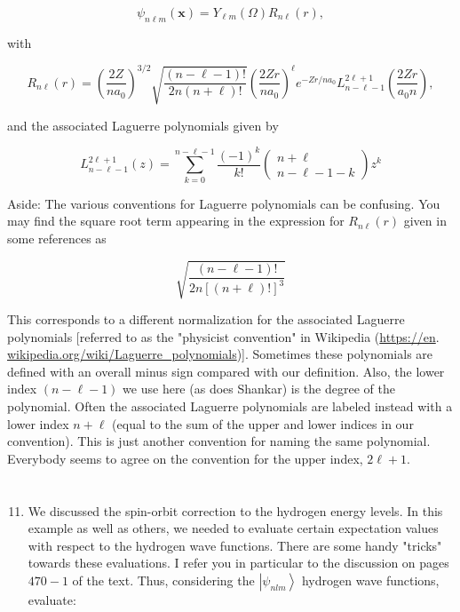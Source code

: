 \documentclass[12pt]{article}
\begin{document}
$$
\psi_{n \ell m}(\mathbf{x})=Y_{\ell m}(\Omega) R_{n \ell}(r),
$$

with

$$
R_{n \ell}(r)=\left(\frac{2 Z}{n a_{0}}\right)^{3 / 2} \sqrt{\frac{(n-\ell-1) !}{2 n(n+\ell) !}}\left(\frac{2 Z r}{n a_{0}}\right)^{\ell} e^{-Z r / n a_{0}} L_{n-\ell-1}^{2 \ell+1}\left(\frac{2 Z r}{a_{0} n}\right),
$$

and the associated Laguerre polynomials given by

$$
L_{n-\ell-1}^{2 \ell+1}(z)=\sum_{k=0}^{n-\ell-1} \frac{(-1)^{k}}{k !}\left(\begin{array}{c}
n+\ell \\
n-\ell-1-k
\end{array}\right) z^{k}
$$

Aside: The various conventions for Laguerre polynomials can be confusing. You may find the square root term appearing in the expression for $R_{n \ell}(r)$ given in some references as

$$
\sqrt{\frac{(n-\ell-1) !}{2 n[(n+\ell) !]^{3}}}
$$

This corresponds to a different normalization for the associated Laguerre polynomials [referred to as the "physicist convention" in Wikipedia (\href{https://en}{https://en}. \href{http://wikipedia.org/wiki/Laguerre_polynomials}{wikipedia.org/wiki/Laguerre\_polynomials})]. Sometimes these polynomials are defined with an overall minus sign compared with our definition. Also, the lower index $(n-\ell-1)$ we use here (as does Shankar) is the degree of the polynomial. Often the associated Laguerre polynomials are labeled instead with a lower index $n+\ell$ (equal to the sum of the upper and lower indices in our convention). This is just another convention for naming the same polynomial. Everybody seems to agree on the convention for the upper index, $2 \ell+1$.
\section{}
\begin{enumerate}
  \setcounter{enumi}{10}
  \item We discussed the spin-orbit correction to the hydrogen energy levels. In this example as well as others, we needed to evaluate certain expectation values with respect to the hydrogen wave functions. There are some handy "tricks" towards these evaluations. I refer you in particular to the discussion on pages $470-1$ of the text. Thus, considering the $\left|\psi_{n l m}\right\rangle$ hydrogen wave functions, evaluate:
\end{enumerate}
\end{document}

